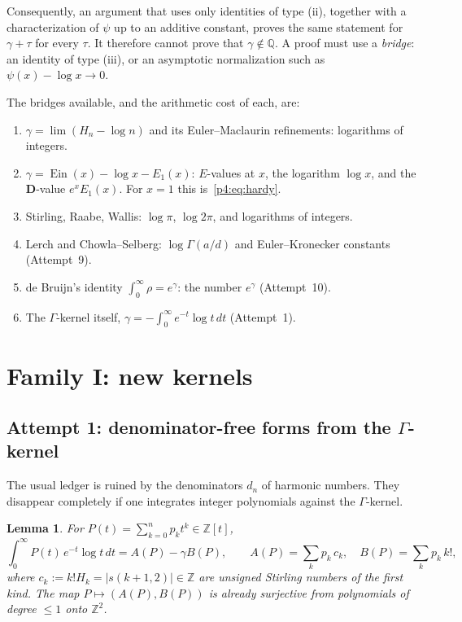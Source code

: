 \documentclass[11pt,a4paper]{article}
\newtheorem{lemma}[theorem]{Lemma}
\theoremstyle{definition}
\theoremstyle{remark}
\newcommand{\Q}{\mathbb Q}
\newcommand{\Z}{\mathbb Z}
\newcommand{\bD}{\mathbf D}
\DeclareMathOperator{\Ein}{Ein}
\numberwithin{equation}{section}
\begin{document}
Consequently, an argument that uses only identities of type (ii), together with a characterization of $\psi$ up to an additive constant, proves the same statement for $\gamma+\tau$ for every $\tau$. It therefore cannot prove that $\gamma\notin\Q$. A proof must use a \emph{bridge}: an identity of type (iii), or an asymptotic normalization such as $\psi(x)-\log x\to0$.

The bridges available, and the arithmetic cost of each, are:
\begin{enumerate}[label=(B\arabic*),leftmargin=3em]
\item $\gamma=\lim(H_n-\log n)$ and its Euler--Maclaurin refinements: logarithms of integers.
\item $\gamma=\Ein(x)-\log x-E_1(x)$: $E$-values at $x$, the logarithm $\log x$, and the $\bD$-value $e^xE_1(x)$. For $x=1$ this is~\eqref{p4:eq:hardy}.
\item Stirling, Raabe, Wallis: $\log\pi$, $\log 2\pi$, and logarithms of integers.
\item Lerch and Chowla--Selberg: $\log\Gamma(a/d)$ and Euler--Kronecker constants (Attempt~9).
\item de Bruijn's identity $\int_0^\infty\rho=e^\gamma$: the number $e^\gamma$ (Attempt~10).
\item The $\Gamma$-kernel itself, $\gamma=-\int_0^\infty e^{-t}\log t\,dt$ (Attempt~1).
\end{enumerate}

\section{Family I: new kernels}\label{p4:sec:kernels}

\subsection{\texorpdfstring{Attempt 1: denominator-free forms from the $\Gamma$-kernel}{Attempt 1: denominator-free forms from the Gamma-kernel}}

The usual ledger is ruined by the denominators $d_n$ of harmonic numbers. They disappear completely if one integrates integer polynomials against the $\Gamma$-kernel.

\begin{lemma}\label{p4:lem:poch}
For $P(t)=\sum_{k=0}^np_kt^k\in\Z[t]$,
\[
\int_0^\infty P(t)\,e^{-t}\log t\,dt = A(P)-\gamma B(P),\qquad A(P)=\sum_k p_k\,c_k,\quad B(P)=\sum_k p_k\,k!,
\]
where $c_k:=k!H_k=|s(k+1,2)|\in\Z$ are unsigned Stirling numbers of the first kind. The map $P\mapsto(A(P),B(P))$ is already surjective from polynomials of degree $\le1$ onto $\Z^2$.
\end{lemma}
\end{document}
